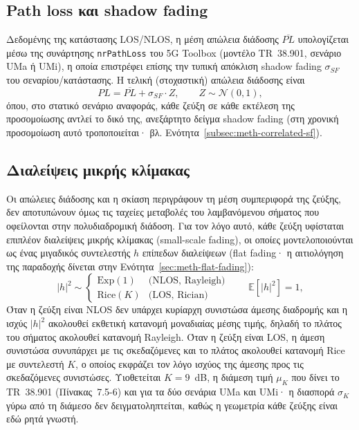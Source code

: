 \subsection{Path loss και shadow fading}

Δεδομένης της κατάστασης LOS/NLOS, η μέση απώλεια διάδοσης
$\overline{PL}$ υπολογίζεται μέσω της συνάρτησης \texttt{nrPathLoss} του
5G Toolbox (μοντέλο TR~38.901, σενάριο UMa ή UMi), η οποία επιστρέφει
επίσης την τυπική απόκλιση shadow fading $\sigma_{SF}$ του σεναρίου/κατάστασης.
Η τελική (στοχαστική) απώλεια διάδοσης είναι
\begin{equation}
PL = \overline{PL} + \sigma_{SF} \cdot Z, \qquad Z \sim \mathcal{N}(0,1),
\label{eq:pathloss-shadowing}
\end{equation}
όπου, στο στατικό σενάριο αναφοράς, κάθε ζεύξη σε κάθε εκτέλεση της
προσομοίωσης αντλεί το δικό της, ανεξάρτητο δείγμα shadow fading (στη
χρονική προσομοίωση αυτό τροποποιείται· βλ.
Ενότητα~\ref{subsec:meth-correlated-sf}).

\subsection{Διαλείψεις μικρής κλίμακας}
\label{subsec:meth-terr-fading}

Οι απώλειες διάδοσης και η σκίαση περιγράφουν τη μέση συμπεριφορά της
ζεύξης, δεν αποτυπώνουν όμως τις ταχείες μεταβολές του λαμβανόμενου
σήματος που οφείλονται στην πολυδιαδρομική διάδοση. Για τον λόγο αυτό,
κάθε ζεύξη υφίσταται επιπλέον διαλείψεις μικρής κλίμακας (small-scale
fading), οι οποίες μοντελοποιούνται ως ένας μιγαδικός συντελεστής $h$
επίπεδων διαλείψεων (flat fading· η αιτιολόγηση της παραδοχής δίνεται στην
Ενότητα~\ref{sec:meth-flat-fading}):
\begin{equation}
|h|^2 \sim
\begin{cases}
\text{Exp}(1) & \text{(NLOS, Rayleigh)} \\[4pt]
\text{Rice}(K) & \text{(LOS, Rician)}
\end{cases}
\qquad \mathbb{E}[|h|^2] = 1,
\label{eq:small-scale-fading}
\end{equation}
Όταν η ζεύξη είναι NLOS δεν υπάρχει κυρίαρχη συνιστώσα άμεσης διαδρομής
και η ισχύς $|h|^2$ ακολουθεί εκθετική κατανομή μοναδιαίας μέσης τιμής,
δηλαδή το πλάτος του σήματος ακολουθεί κατανομή Rayleigh. Όταν η ζεύξη
είναι LOS, η άμεση συνιστώσα συνυπάρχει με τις σκεδαζόμενες και το πλάτος
ακολουθεί κατανομή Rice με συντελεστή $K$, ο οποίος εκφράζει τον λόγο
ισχύος της άμεσης προς τις σκεδαζόμενες συνιστώσες. Υιοθετείται $K =
9$~dB, η διάμεση τιμή $\mu_K$ που δίνει το TR~38.901 (Πίνακας~7.5-6) και
για τα δύο σενάρια UMa και UMi· η διασπορά $\sigma_K$ γύρω από τη διάμεσο
δεν δειγματοληπτείται, καθώς η γεωμετρία κάθε ζεύξης είναι εδώ ρητά
γνωστή.

